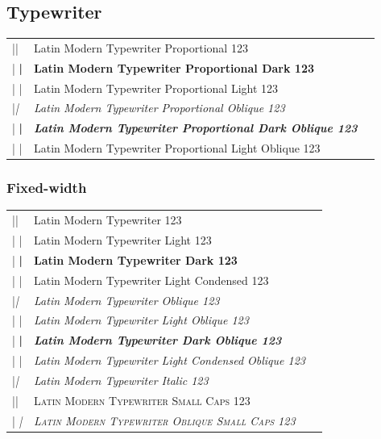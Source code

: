 \documentclass[a4paper]{article}
\makeatletter
\newenvironment{vrb}{\begin{tabular}{@{}p{5cm}ll@{}}}{\end{tabular}}
\makeatother
\begin{document}
\subsection*{Typewriter}

\ttfamily
\tvstyle
\begin{vrb}
|\ttfamily\tvstyle | & {Latin Modern Typewriter Proportional 123} \\
|  \bfseries | & {\bfseries Latin Modern Typewriter Proportional Dark 123} \\
|  \lgweight | & {\lgweight Latin Modern Typewriter Proportional Light 123} \\
|\slshape | & {\slshape Latin Modern Typewriter Proportional Oblique 123} \\
|  \bfseries | & {\bfseries\slshape Latin Modern Typewriter Proportional Dark Oblique 123} \\
|  \lgweight | & {\lgweight Latin Modern Typewriter Proportional Light Oblique 123} \\
\end{vrb}

\subsubsection*{Fixed-width}

\tmstyle
\begin{vrb}
|\ttfamily\tmstyle | & {Latin Modern Typewriter 123} \\
|  \lgweight | & {\lgweight Latin Modern Typewriter Light 123} \\
|  \bfseries | & {\bfseries Latin Modern Typewriter Dark 123} \\
|  \fontseries{lc}\selectfont | & {\fontseries{lc}\selectfont Latin Modern Typewriter Light Condensed 123} \\
|\slshape | & {\slshape Latin Modern Typewriter Oblique 123} \\
|  \lgweight | & {\lgweight\slshape Latin Modern Typewriter Light Oblique 123} \\
|  \bfseries | & {\bfseries\slshape Latin Modern Typewriter Dark Oblique 123} \\
|  \fontseries{lc} | & {\fontseries{lc}\slshape Latin Modern Typewriter Light Condensed Oblique 123} \\
|\itshape | & {\itshape Latin Modern Typewriter Italic 123} \\
|\scshape | & {\scshape Latin Modern Typewriter Small Caps 123} \\
|  \slshape | & {\scshape\slshape Latin Modern Typewriter Oblique Small Caps 123} \\
\end{vrb}
\end{document}
